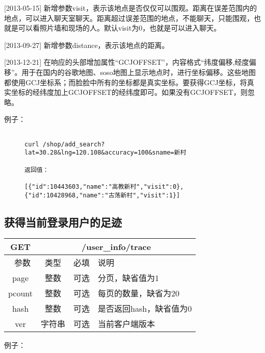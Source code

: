 \documentclass[cs4size]{ctexartutf8}
\begin{document}
[2013-05-15] 新增参数visit，表示该地点是否仅仅可以围观。距离在误差范围内的地点，可以进入聊天室聊天。距离超过误差范围的地点，不能聊天，只能围观，也就是可以看照片墙和现场的人。默认visit为0，也就是可以进入聊天。

[2013-09-27] 新增参数distance，表示该地点的距离。

[2013-12-21] 在响应的头部增加属性“GCJOFFSET”，内容格式“纬度偏移,经度偏移”。用于在国内的谷歌地图、soso地图上显示地点时，进行坐标偏移。这些地图都使用GCJ坐标系；而脸脸中所有的坐标都是真实坐标。要获得GCJ坐标，将真实坐标的经纬度加上GCJOFFSET的经纬度即可。如果没有GCJOFFSET，则忽略。

例子：

\begin{figure}[H]
\begin{verbatim}

curl /shop/add_search?lat=30.28&lng=120.108&accuracy=100&sname=新村

返回值：

[{"id":10443603,"name":"高教新村","visit":0},{"id":10428968,"name":"古荡新村","visit":1}]

\end{verbatim}
\end{figure}


\subsection{获得当前登录用户的足迹}

\begin{table}[H]
   \begin{center}
\begin{tabular}{|c|c|c|p{12cm}|}
\hline
GET & \multicolumn{3}{|c|}{/user\_info/trace} \\
\hline\hline
 \  参数  & 类型 & 必填 &  说明  \\
   \hline
 page  & 整数 & 可选 & 分页，缺省值为1\\ 
 \hline
 pcount  & 整数 & 可选 & 每页的数量，缺省为20\\ 
  \hline
 hash  & 整数 & 可选 & 是否返回hash，缺省值为0\\
  \hline
 ver  & 字符串 & 可选 & 当前客户端版本\\ 
 \hline
\end{tabular}
   \end{center}
\end{table}

例子：
\end{document}
